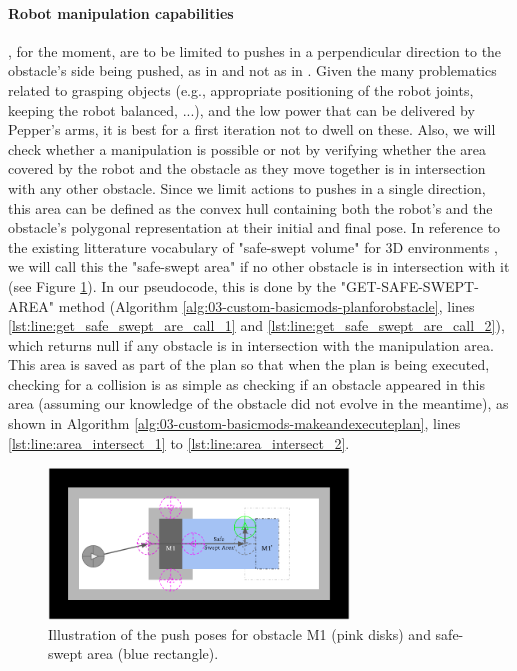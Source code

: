 \paragraph{Robot manipulation capabilities}, for the moment, are to be limited to pushes in a perpendicular direction to the obstacle's side being pushed, as in \parencite{wu_navigation_2010} and not as in \parencite{levihn_locally_2014}. Given the many problematics related to grasping objects (e.g., appropriate positioning of the robot joints, keeping the robot balanced, ...), and the low power that can be delivered by Pepper's arms, it is best for a first iteration not to dwell on these. Also, we will check whether a manipulation is possible or not by verifying whether the area covered by the robot and the obstacle as they move together is in intersection with any other obstacle. Since we limit actions to pushes in a single direction, this area can be defined as the convex hull containing both the robot's and the obstacle's polygonal representation at their initial and final pose. In reference to the existing litterature vocabulary of "safe-swept volume" for 3D environments \parencite{foisy_safe_1994, stilman_navigation_2007}, we will call this the "safe-swept area" if no other obstacle is in intersection with it (see Figure \ref{fig:push_pose_and_ssa}). In our pseudocode, this is done by the "GET-SAFE-SWEPT-AREA" method (Algorithm \ref{alg:03-custom-basicmods-planforobstacle}, lines \ref{lst:line:get_safe_swept_are_call_1} and \ref{lst:line:get_safe_swept_are_call_2}), which returns null if any obstacle is in intersection with the manipulation area. This area is saved as part of the plan so that when the plan is being executed, checking for a collision is as simple as checking if an obstacle appeared in this area (assuming our knowledge of the obstacle did not evolve in the meantime), as shown in Algorithm \ref{alg:03-custom-basicmods-makeandexecuteplan}, lines \ref{lst:line:area_intersect_1} to \ref{lst:line:area_intersect_2}.

\begin{figure}[H]
  \centering
  \includegraphics[width=8cm]{Figures/Push_Pose_And_SSA/push_pose_and_ssa.png}
  \caption{Illustration of the push poses for obstacle M1 (pink disks) and safe-swept area (blue rectangle).}
  \label{fig:push_pose_and_ssa}
\end{figure}

